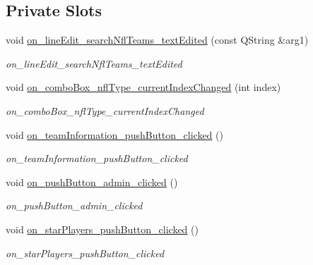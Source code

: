 \subsection*{Private Slots}
\begin{DoxyCompactItemize}
\item 
void \hyperlink{class_main_window_a86d14b6b49616c5c97cda8d10d93807e}{on\+\_\+line\+Edit\+\_\+search\+Nfl\+Teams\+\_\+text\+Edited} (const Q\+String \&arg1)
\begin{DoxyCompactList}\small\item\em on\+\_\+line\+Edit\+\_\+search\+Nfl\+Teams\+\_\+text\+Edited \end{DoxyCompactList}\item 
void \hyperlink{class_main_window_af3fe77cd642889876878bbea43684691}{on\+\_\+combo\+Box\+\_\+nfl\+Type\+\_\+current\+Index\+Changed} (int index)
\begin{DoxyCompactList}\small\item\em on\+\_\+combo\+Box\+\_\+nfl\+Type\+\_\+current\+Index\+Changed \end{DoxyCompactList}\item 
\mbox{\label{class_main_window_a68508cba952752d1c821e6ee2ab8c412}} 
void \hyperlink{class_main_window_a68508cba952752d1c821e6ee2ab8c412}{on\+\_\+team\+Information\+\_\+push\+Button\+\_\+clicked} ()
\begin{DoxyCompactList}\small\item\em on\+\_\+team\+Information\+\_\+push\+Button\+\_\+clicked \end{DoxyCompactList}\item 
\mbox{\label{class_main_window_ab10feb3d5c8acded0dc415a578c0821e}} 
void \hyperlink{class_main_window_ab10feb3d5c8acded0dc415a578c0821e}{on\+\_\+push\+Button\+\_\+admin\+\_\+clicked} ()
\begin{DoxyCompactList}\small\item\em on\+\_\+push\+Button\+\_\+admin\+\_\+clicked \end{DoxyCompactList}\item 
\mbox{\label{class_main_window_a5ffb51b4584759533c8e4a5b6c69dae4}} 
void \hyperlink{class_main_window_a5ffb51b4584759533c8e4a5b6c69dae4}{on\+\_\+star\+Players\+\_\+push\+Button\+\_\+clicked} ()
\begin{DoxyCompactList}\small\item\em on\+\_\+star\+Players\+\_\+push\+Button\+\_\+clicked \end{DoxyCompactList}\item 

\end{DoxyCompactItemize}
